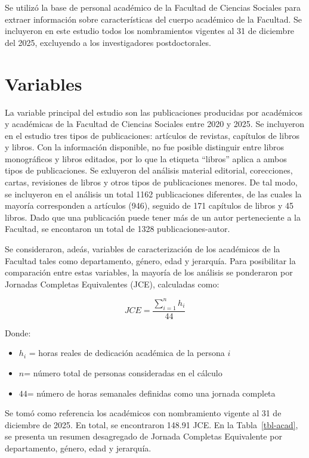 \documentclass[
  a4paper,
  oneside]{scrbook}
\begin{document}
Se utilizó la base de personal académico de la Facultad de Ciencias
Sociales para extraer información sobre características del cuerpo
académico de la Facultad. Se incluyeron en este estudio todos los
nombramientos vigentes al 31 de diciembre del 2025, excluyendo a los
investigadores postdoctorales.

\section{Variables}\label{variables}

La variable principal del estudio son las publicaciones producidas por
académicos y académicas de la Facultad de Ciencias Sociales entre 2020 y
2025. Se incluyeron en el estudio tres tipos de publicaciones: artículos
de revistas, capítulos de libros y libros. Con la información
disponible, no fue posible distinguir entre libros monográficos y libros
editados, por lo que la etiqueta ``libros'' aplica a ambos tipos de
publicaciones. Se exluyeron del análisis material editorial,
corecciones, cartas, revisiones de libros y otros tipos de publicaciones
menores. De tal modo, se incluyeron en el análisis un total 1162
publicaciones diferentes, de las cuales la mayoría corresponden a
artículos (946), seguido de 171 capítulos de libros y 45 libros. Dado
que una publicación puede tener más de un autor perteneciente a la
Facultad, se encontaron un total de 1328 publicaciones-autor.

Se consideraron, adeás, variables de caracterización de los académicos
de la Facultad tales como departamento, género, edad y jerarquía. Para
posibilitar la comparación entre estas variables, la mayoría de los
análisis se ponderaron por Jornadas Completas Equivalentes (JCE),
calculadas como:

\[JCE = \frac{\sum_{i=1}^{n} h_i}{44}\]

Donde:

\begin{itemize}
\item
  \(h_i\) = horas reales de dedicación académica de la persona \(i\)
\item
  \(n\)= número total de personas consideradas en el cálculo
\item
  \(44\)= número de horas semanales definidas como una jornada completa
\end{itemize}

Se tomó como referencia los académicos con nombramiento vigente al 31 de
diciembre de 2025. En total, se encontraron 148.91 JCE. En la
Tabla~\ref{tbl-acad}, se presenta un resumen desagregado de Jornada
Completas Equivalente por departamento, género, edad y jerarquía.
\end{document}
